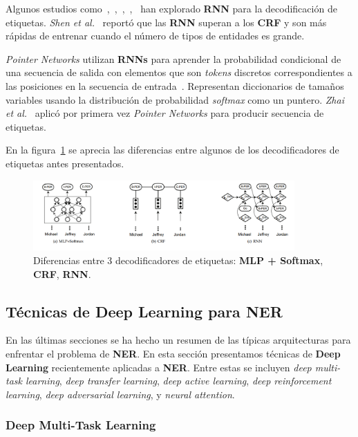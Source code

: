 Algunos estudios como~\cite{shen2017deep},~\cite{nguyen2016toward},~\cite{zheng2017joint},~\cite{zhou2017joint},~\cite{vaswani2016supertagging} han explorado \textbf{RNN} para la decodificaci\'on de etiquetas. \emph{Shen et al.}~\cite{shen2017deep} report\'o que las \textbf{RNN} superan a los \textbf{CRF} y son m\'as r\'apidas de entrenar cuando el n\'umero de tipos de entidades es grande.

\emph{Pointer Networks} utilizan \textbf{RNNs} para aprender la probabilidad condicional de una secuencia de salida con elementos que son \emph{tokens} discretos correspondientes a las posiciones en la secuencia de entrada~\cite{vinyals2015pointer}. Representan diccionarios de tama\~nos variables usando la distribuci\'on de probabilidad \emph{softmax} como un puntero. \emph{Zhai et al.}~\cite{zhai2017neural} aplic\'o por primera vez \emph{Pointer Networks} para producir secuencia de etiquetas.

En la figura~\ref{fig:tagDec} se aprecia las diferencias entre algunos de los decodificadores de etiquetas antes presentados.

\begin{figure}[h!]
	\centering
	\includegraphics[width = 10cm]{Imagenes/TagDecoders.png}
	\caption{Diferencias entre 3 decodificadores de etiquetas: \textbf{MLP + Softmax}, \textbf{CRF}, \textbf{RNN}.}\label{fig:tagDec}
\end{figure}


\subsection{T\'ecnicas de Deep Learning para NER}
En las \'ultimas secciones se ha hecho un resumen de las t\'ipicas arquitecturas para enfrentar el problema de \textbf{NER}. En esta secci\'on presentamos t\'ecnicas de \textbf{Deep Learning} recientemente aplicadas a \textbf{NER}. Entre estas se incluyen \emph{deep multi-task learning}, \emph{deep transfer learning}, \emph{deep active learning}, \emph{deep reinforcement learning}, \emph{deep adversarial learning}, y \emph{neural attention}.

\subsubsection{Deep Multi-Task Learning}

